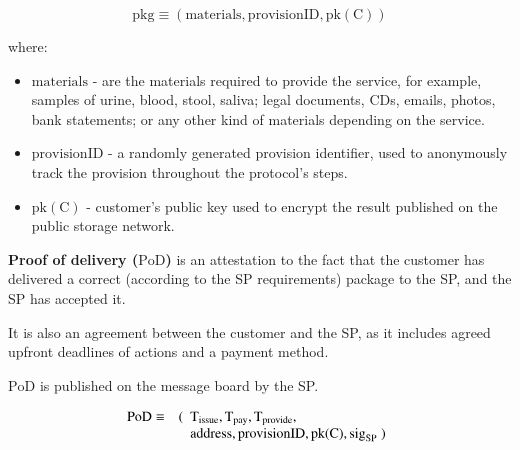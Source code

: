 $$\mathrm{pkg} \equiv (\mathrm{materials}, \mathrm{provisionID}, \mathrm{pk(C)})$$

where:

\begin{itemize}

\item $\mathrm{materials}$ - are the materials required to provide the service, for example, samples of urine, blood, stool, saliva; legal documents, CDs, emails, photos, bank statements; or any other kind of materials depending on the service.
\item $\mathrm{provisionID}$ - a randomly generated provision identifier, used to anonymously track the provision throughout the protocol's steps.
\item $\mathrm{pk(C)}$ - customer's public key used to encrypt the result published on the public storage network.
\end{itemize}

\noindent \textbf
{Proof of delivery ($\mathrm{PoD}$)}\label{proof-of-delivery} is an attestation to the fact that the customer has delivered a correct (according to the SP requirements) package to the SP, and the SP has accepted it.

It is also an agreement between the customer and the SP, as it includes agreed upfront deadlines of actions and a payment method.

$\mathrm{PoD}$ is published on the message board by the SP.

\begin{eqnarray}
\mathrm{PoD} & \equiv & (\begin{array}[t]{l}\mathrm{T}_\mathrm{issue}, \mathrm{T}_\mathrm{pay}, \mathrm{T}_\mathrm{provide},\\ \mathrm{address}, \mathrm{provisionID}, \mathrm{pk(C)}, \mathrm{sig}_\mathrm{SP} \; )\end{array}
\end{eqnarray}


